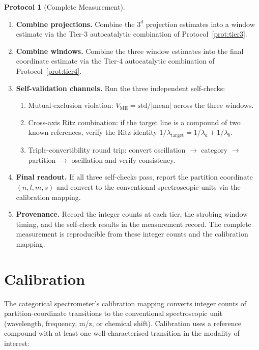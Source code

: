 \documentclass[twocolumn,11pt,a4paper]{article}
\theoremstyle{thmstyle}
\theoremstyle{axiomstyle}
\theoremstyle{definition}
\newtheorem{protocol}[theorem]{Protocol}
\theoremstyle{remark}
\newcommand{\Vme}{V_{\mathrm{ME}}}
\begin{document}
\begin{protocol}[Complete Measurement]
\begin{enumerate}[label=\textbf{Step \arabic*:},leftmargin=*]
\item \textbf{Combine projections.} Combine the $3^{d}$ projection estimates into a window estimate via the Tier-3 autocatalytic combination of Protocol~\ref{prot:tier3}.

\item \textbf{Combine windows.} Combine the three window estimates into the final coordinate estimate via the Tier-4 autocatalytic combination of Protocol~\ref{prot:tier4}.

\item \textbf{Self-validation channels.} Run the three independent self-checks:
  \begin{enumerate}[label=(\alph*),nosep]
  \item Mutual-exclusion violation: $\Vme=\mathrm{std}/|\mathrm{mean}|$ across the three windows.
  \item Cross-axis Ritz combination: if the target line is a compound of two known references, verify the Ritz identity $1/\lambda_{\mathrm{target}}=1/\lambda_{a}+1/\lambda_{b}$.
  \item Triple-convertibility round trip: convert oscillation $\to$ category $\to$ partition $\to$ oscillation and verify consistency.
  \end{enumerate}

\item \textbf{Final readout.} If all three self-checks pass, report the partition coordinate $(n,l,m,s)$ and convert to the conventional spectroscopic units via the calibration mapping.

\item \textbf{Provenance.} Record the integer counts at each tier, the strobing window timing, and the self-check results in the measurement record. The complete measurement is reproducible from these integer counts and the calibration mapping.
\end{enumerate}
\end{protocol}

\section{Calibration}
\label{sec:methods_calibration}

The categorical spectrometer's calibration mapping converts integer counts of partition-coordinate transitions to the conventional spectroscopic unit (wavelength, frequency, m/z, or chemical shift). Calibration uses a reference compound with at least one well-characterised transition in the modality of interest:
\end{document}

